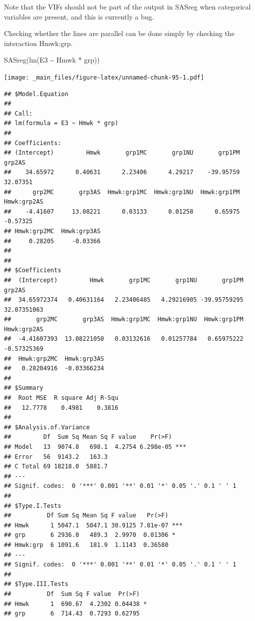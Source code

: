 \documentclass[
]{book}
\newenvironment{Shaded}{\begin{snugshade}}{\end{snugshade}}
\newcommand{\FunctionTok}[1]{\textcolor[rgb]{0.00,0.00,0.00}{#1}}
\newcommand{\NormalTok}[1]{#1}
\newcommand{\SpecialCharTok}[1]{\textcolor[rgb]{0.00,0.00,0.00}{#1}}
\begin{document}
Note that the VIFs should not be part of the output in SASreg when categorical variables are present, and this is currently a bug.

Checking whether the lines are parallel can be done simply by checking the interaction Hmwk:grp.

\begin{Shaded}
\begin{Highlighting}[]
\FunctionTok{SASreg}\NormalTok{(}\FunctionTok{lm}\NormalTok{(E3 }\SpecialCharTok{\textasciitilde{}}\NormalTok{ Hmwk }\SpecialCharTok{*}\NormalTok{ grp))}
\end{Highlighting}
\end{Shaded}

\texttt{[image: \_main\_files/figure-latex/unnamed-chunk-95-1.pdf]}

\begin{verbatim}
## $Model.Equation
## 
## Call:
## lm(formula = E3 ~ Hmwk * grp)
## 
## Coefficients:
## (Intercept)         Hmwk       grp1MC       grp1NU       grp1PM       grp2AS  
##    34.65972      0.40631      2.23406      4.29217    -39.95759     32.07351  
##      grp2MC       grp3AS  Hmwk:grp1MC  Hmwk:grp1NU  Hmwk:grp1PM  Hmwk:grp2AS  
##    -4.41607     13.08221      0.03133      0.01258      0.65975     -0.57325  
## Hmwk:grp2MC  Hmwk:grp3AS  
##     0.28205     -0.03366  
## 
## 
## $Coefficients
##  (Intercept)         Hmwk       grp1MC       grp1NU       grp1PM       grp2AS 
##  34.65972374   0.40631164   2.23406485   4.29216905 -39.95759295  32.07351063 
##       grp2MC       grp3AS  Hmwk:grp1MC  Hmwk:grp1NU  Hmwk:grp1PM  Hmwk:grp2AS 
##  -4.41607393  13.08221050   0.03132616   0.01257784   0.65975222  -0.57325369 
##  Hmwk:grp2MC  Hmwk:grp3AS 
##   0.28204916  -0.03366234 
## 
## $Summary
##  Root MSE  R square Adj R-Squ 
##   12.7778    0.4981    0.3816 
## 
## $Analysis.of.Variance
##         Df  Sum Sq Mean Sq F value    Pr(>F)    
## Model   13  9074.8   698.1  4.2754 6.298e-05 ***
## Error   56  9143.2   163.3                      
## C Total 69 18218.0  5881.7                      
## ---
## Signif. codes:  0 '***' 0.001 '**' 0.01 '*' 0.05 '.' 0.1 ' ' 1
## 
## $Type.I.Tests
##          Df Sum Sq Mean Sq F value   Pr(>F)    
## Hmwk      1 5047.1  5047.1 30.9125 7.81e-07 ***
## grp       6 2936.0   489.3  2.9970  0.01306 *  
## Hmwk:grp  6 1091.6   181.9  1.1143  0.36580    
## ---
## Signif. codes:  0 '***' 0.001 '**' 0.01 '*' 0.05 '.' 0.1 ' ' 1
## 
## $Type.III.Tests
##          Df  Sum Sq F value  Pr(>F)  
## Hmwk      1  690.67  4.2302 0.04438 *
## grp       6  714.43  0.7293 0.62795  

\end{verbatim}
\end{document}
